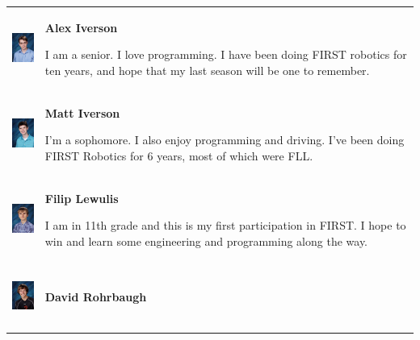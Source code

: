 \begin{tabular}{p{2cm}b{8cm}}
 \includegraphics[height=2cm,keepaspectratio=true]{./TeamSection/IversonAlex.jpg}&

 \textbf{Alex Iverson}
 
 \medskip 
 
 I am a senior. I love programming. I have been doing FIRST robotics for ten years, and hope that my last season will be one to remember.\\

 \includegraphics[height=2cm,keepaspectratio=true]{./TeamSection/IversonMatt.jpg}&

 \textbf{Matt Iverson}
 
 \medskip 
 
 I'm a sophomore. I also enjoy programming and driving. I've been doing FIRST Robotics for 6 years, most of which were FLL.\\
 
 \includegraphics[height=2cm,keepaspectratio=true]{./TeamSection/LewulisFilip.jpg}&

 \textbf{Filip Lewulis}
 
 \medskip 

 I am in 11th grade and this is my first participation in FIRST. I hope to win and learn some engineering and programming along the way.\\
 
 \includegraphics[height=2cm,keepaspectratio=true]{./TeamSection/RohrbaughDavid.jpg}&

 \textbf{David Rohrbaugh}
 

\end{tabular}
